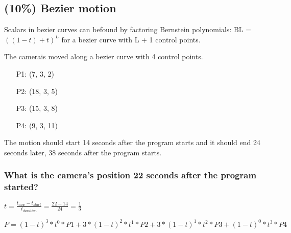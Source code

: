 \subsection{(10\%) Bezier motion}
Scalars in bezier curves can befound by factoring Bernstein polynomials: BL = $((1-t) + t)^L$ for a bezier curve with L + 1 control points.

The camerais moved along a bezier curve with 4 control points.
\begin{itemize}
    \item[P1:] (7, 3, 2)
    \item[P2:] (18, 3, 5)
    \item[P3:] (15, 3, 8)
    \item[P4:] (9, 3, 11)
\end{itemize}

The motion should start 14 seconds after the program starts and it should end 24 seconds later, 38 seconds after the program starts.

\subsubsection{What is the camera's position 22 seconds after the program started?}


$
    t
=
    \frac{t_{now} - t_{start}}{t_{duration}}
=
    \frac{22 - 14}{24}
=
    \frac{1}{3}
$

$
    P
=
        (1-t)^3 * t^0 * P1 +
    3 * (1-t)^2 * t^1 * P2 +
    3 * (1-t)^1 * t^2 * P3 +
        (1-t)^0 * t^3 * P4
$

